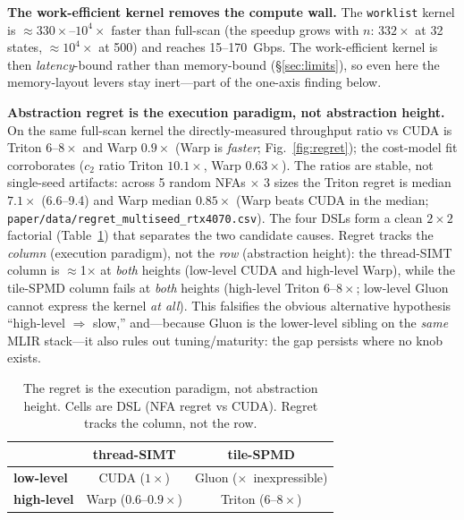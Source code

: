 \documentclass[conference]{IEEEtran}
\newcommand{\xmark}{$\times$}
\begin{document}
\textbf{The work-efficient kernel removes the compute wall.} The \texttt{worklist} kernel is
$\approx\!330\times$--$10^4\times$ faster than full-scan (the speedup grows with $n$: $332\times$
at 32 states, $\approx\!10^4\times$ at 500) and reaches 15--170~Gbps. The work-efficient kernel
is then \emph{latency}-bound rather than memory-bound (\S\ref{sec:limits}), so even here the
memory-layout levers stay inert---part of the one-axis finding below.

\textbf{Abstraction regret is the execution paradigm, not abstraction height.} On the same
full-scan kernel the directly-measured throughput ratio vs CUDA is Triton $6$--$8\times$ and
Warp $0.9\times$ (Warp is \emph{faster}; Fig.~\ref{fig:regret}); the cost-model fit corroborates
($c_2$ ratio Triton $10.1\times$, Warp $0.63\times$). The ratios are stable, not single-seed
artifacts: across 5 random NFAs $\times$ 3 sizes the Triton regret is median $7.1\times$
(6.6--9.4) and Warp median $0.85\times$ (Warp beats CUDA in the median;
\texttt{paper/data/regret\_multiseed\_rtx4070.csv}). The four DSLs form a clean $2\times2$
factorial (Table~\ref{tab:twobytwo}) that separates the two candidate causes. Regret tracks the
\emph{column} (execution paradigm), not the \emph{row} (abstraction height): the thread-SIMT
column is $\approx$1$\times$ at \emph{both} heights (low-level CUDA and high-level Warp), while
the tile-SPMD column fails at \emph{both} heights (high-level Triton $6$--$8\times$; low-level
Gluon cannot express the kernel \emph{at all}). This falsifies the obvious alternative
hypothesis ``high-level $\Rightarrow$ slow,'' and---because Gluon is the lower-level sibling on
the \emph{same} MLIR stack---it also rules out tuning/maturity: the gap persists where no knob
exists.

\begin{table}[t]
\centering
\caption{The regret is the execution paradigm, not abstraction height. Cells are
DSL (NFA regret vs CUDA). Regret tracks the column, not the row.}
\label{tab:twobytwo}
\small
\begin{tabular}{lcc}
\toprule
 & \textbf{thread-SIMT} & \textbf{tile-SPMD} \\
\midrule
\textbf{low-level}  & CUDA ($1\times$)        & Gluon (\xmark\ inexpressible) \\
\textbf{high-level} & Warp ($0.6$--$0.9\times$) & Triton ($6$--$8\times$) \\
\bottomrule
\end{tabular}
\end{table}
\end{document}
